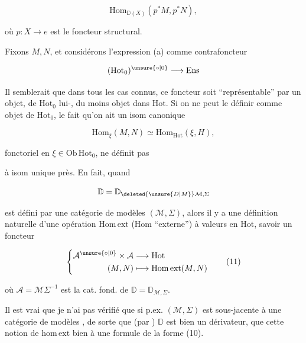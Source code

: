 \[\mathrm{Hom}_{\mathbb D(X)}(p^*M,p^*N),\]

où $p:X\longrightarrow e$ est le foncteur structural.

Fixons $M,N$, et considérons l'expression (a) comme contrafoncteur

\[(\mathrm{Hot}_0)^{\unsure{\circ|0}}\longrightarrow\mathrm{Ens}\]

Il semblerait que dans tous les cas connus, ce foncteur soit ``représentable'' par un objet,  de $\mathrm{Hot}_0$ lui-, du moins objet dans $\mathrm{Hot}$.  Si on ne peut le définir comme objet  de $\mathrm{Hot}_0$, le fait qu'on ait un isom canonique

\[\mathrm{Hom}_{\xi}(M,N)\simeq\mathrm{Hom}_{\mathrm{Hot}}(\xi,H),\tag*{(10)}\]

fonctoriel en $\xi\in\mathrm{Ob}\,\mathrm{Hot}_0$, ne définit pas 


à isom unique près. En fait, quand

\[\mathbb D=\mathbb D_{\deleted{\unsure{D|M}}\mathcal M,\Sigma}\]

est défini par une catégorie de modèles $(\mathcal M,\Sigma)$, alors il y a une définition naturelle  d'une opération $\mathrm{Hom\,ext}$ (Hom ``externe'') à valeurs en $\mathrm{Hot}$,  savoir un foncteur

\[
\left\{\begin{aligned}
\mathcal A^{\unsure{\circ|0}}\times\mathcal A&\longrightarrow\mathrm{Hot}\\
(M,N)&\longmapsto\mathrm{Hom\,ext}(M,N)
\end{aligned}\right.\tag*{(11)}
\]

où $\mathcal A=\mathcal M\Sigma^{-1}$ est la cat. fond. de $\mathbb D=\mathbb D_{\mathcal M,\Sigma}$.

 Il est vrai que je n'ai pas vérifié que si p.ex. $(\mathcal M,\Sigma)$ est sous-jacente à une catégorie de modèles , de sorte que (par ) $\mathbb D$ est bien un dérivateur, que cette notion de $\mathrm{hom\,ext}$  bien à une formule de la forme (10).

